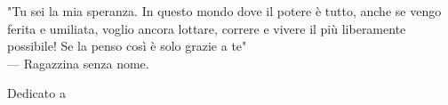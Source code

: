 \cleardoublepage
{}
\thispagestyle{empty}

\vspace*{3cm}

\begin{center}
    "Tu sei la mia speranza. In questo mondo dove il potere è tutto, anche se vengo ferita e umiliata, voglio ancora lottare, correre e vivere il più liberamente possibile! \newline Se la penso così è solo grazie a te" \\ \medskip
    --- Ragazzina senza nome. 
\end{center}

\medskip

\begin{center}
    Dedicato a
\end{center}
